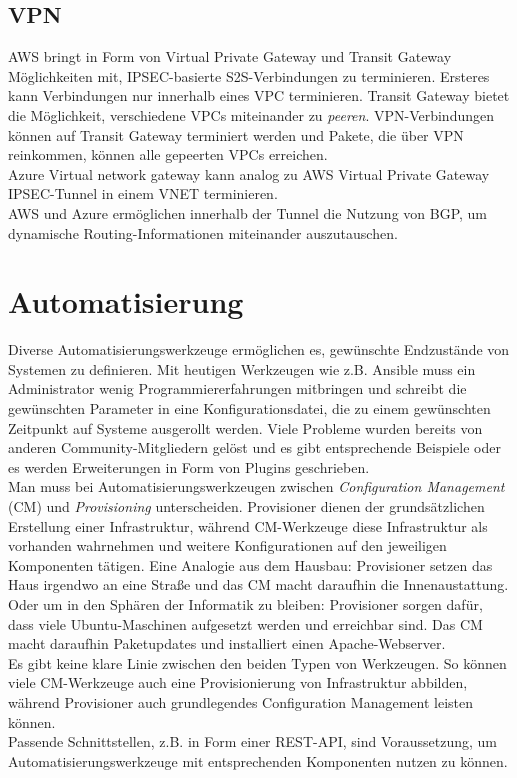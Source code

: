 \subsection{VPN}
AWS bringt in Form von Virtual Private Gateway und Transit Gateway Möglichkeiten mit, IPSEC-basierte S2S-Verbindungen zu terminieren. Ersteres kann Verbindungen nur innerhalb eines VPC terminieren. Transit Gateway bietet die Möglichkeit, verschiedene VPCs miteinander zu \textit{peeren}. VPN-Verbindungen können auf Transit Gateway terminiert werden und Pakete, die über VPN reinkommen, können alle gepeerten VPCs erreichen.\\
Azure Virtual network gateway kann analog zu AWS Virtual Private Gateway IPSEC-Tunnel in einem VNET terminieren.\\
AWS und Azure ermöglichen innerhalb der Tunnel die Nutzung von BGP, um dynamische Routing-Informationen miteinander auszutauschen.

\section{Automatisierung}\label{automatisierung}

Diverse Automatisierungswerkzeuge ermöglichen es, gewünschte Endzustände von Systemen zu definieren. Mit heutigen Werkzeugen wie z.B. Ansible muss ein Administrator wenig Programmiererfahrungen mitbringen und schreibt die gewünschten Parameter in eine Konfigurationsdatei, die zu einem gewünschten Zeitpunkt auf Systeme ausgerollt werden. Viele Probleme wurden bereits von anderen Community-Mitgliedern gelöst und es gibt entsprechende Beispiele oder es werden Erweiterungen in Form von Plugins geschrieben.\\
Man muss bei Automatisierungswerkzeugen zwischen \textit{Configuration Management} (CM) und \textit{Provisioning} unterscheiden. Provisioner dienen der grundsätzlichen Erstellung einer Infrastruktur, während CM-Werkzeuge diese Infrastruktur als vorhanden wahrnehmen und weitere Konfigurationen auf den jeweiligen Komponenten tätigen\cite[S.20]{Brikman2019}. Eine Analogie aus dem Hausbau: Provisioner setzen das Haus irgendwo an eine Straße und das CM macht daraufhin die Innenaustattung. Oder um in den Sphären der Informatik zu bleiben: Provisioner sorgen dafür, dass viele Ubuntu-Maschinen aufgesetzt werden und erreichbar sind. Das CM macht daraufhin Paketupdates und installiert einen Apache-Webserver.\\
Es gibt keine klare Linie zwischen den beiden Typen von Werkzeugen. So können viele CM-Werkzeuge auch eine Provisionierung von Infrastruktur abbilden, während Provisioner auch grundlegendes Configuration Management leisten können\cite[S.20]{Brikman2019}.\\
Passende Schnittstellen, z.B. in Form einer REST-API, sind Voraussetzung, um Automatisierungswerkzeuge mit entsprechenden Komponenten nutzen zu können.

